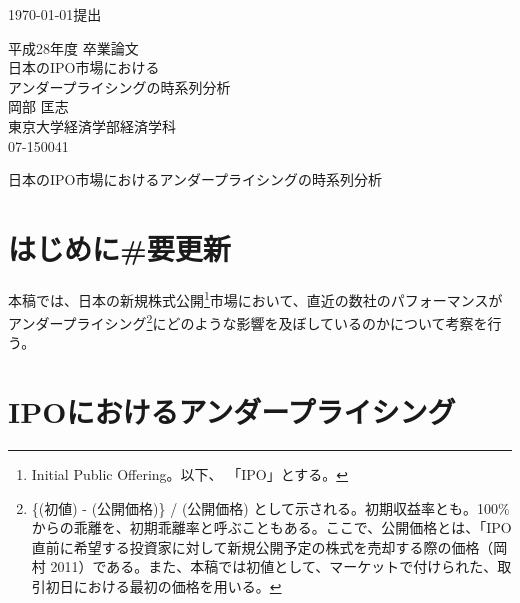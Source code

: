 \documentclass{jsarticle}
\begin{document}
\renewcommand\thefootnote{\arabic{footnote})}



{\Large \today 提出}\\ %

\begin{center}
\vspace{120truept}
{\huge 平成28年度 卒業論文\\[10mm]
日本のIPO市場における\\アンダープライシングの時系列分析}\\ %
\vspace{120truept}
{\huge 岡部 匡志\\
\vspace{50truept}
東京大学経済学部経済学科\\
\vspace{50truept}
07-150041}\\ %

\end{center}
\newpage
\begin{center}
{\Large 日本のIPO市場におけるアンダープライシングの時系列分析}\\ %
\end{center}

\tableofcontents

\vspace{50truept}
\section{はじめに\#要更新}
本稿では、日本の新規株式公開\footnote[1]{Initial Public Offering。以下、 「IPO」とする。}市場において、直近の数社のパフォーマンスがアンダープライシング\footnote[2]{\{(初値) - (公開価格)\} / (公開価格) として示される。初期収益率とも。100\%からの乖離を、初期乖離率と呼ぶこともある。ここで、公開価格とは、「IPO直前に希望する投資家に対して新規公開予定の株式を売却する際の価格（岡村 2011\cite{okamura}）である。また、本稿では初値として、マーケットで付けられた、取引初日における最初の価格を用いる。}にどのような影響を及ぼしているのかについて考察を行う。
\section{IPOにおけるアンダープライシング}
\end{document}
